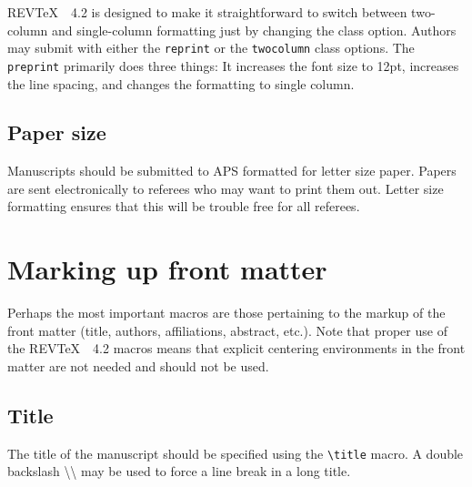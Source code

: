 \documentclass[twocolumn,secnumarabic,amssymb, nobibnotes, aps, prd]{revtex4-2}
\newcommand{\revtex}{REV\TeX\ }
\newcommand{\classoption}[1]{\texttt{#1}}
\newcommand{\macro}[1]{\texttt{\textbackslash#1}}
\newcommand{\m}[1]{\macro{#1}}
\begin{document}
\revtex\ 4.2 is designed to
make it straightforward to switch between two-column and single-column
formatting just by changing the class option. Authors may submit with
either the \classoption{reprint} or the \classoption{twocolumn} class options.
The \classoption{preprint} primarily does three things: It increases
the font size to 12pt, increases the line spacing, and changes the
formatting to single column.

\subsection{Paper size}
Manuscripts should be submitted to APS formatted for letter size
paper. Papers are sent electronically to referees who may
want to print them out. Letter size formatting ensures that this will
be trouble free for all referees.

\section{Marking up front matter}
Perhaps the most important macros are those 
pertaining to the markup of the front matter (title, authors,
affiliations, abstract, etc.). Note that proper
use of the \revtex\ 4.2 macros means that explicit centering environments
in the front matter are not needed and should not be used.

\subsection{Title}
The title of the manuscript should be specified using the \m{title} macro. A
double backslash {\textbackslash\textbackslash} may be used to force a line break in a long
title.
\end{document}
